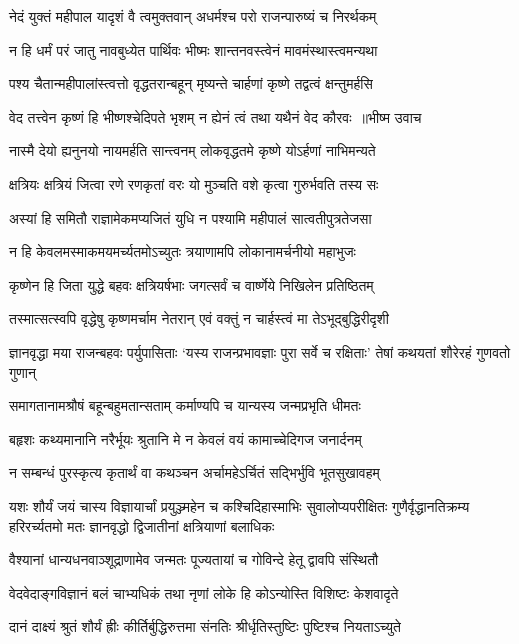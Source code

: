\twolineshloka
{नेदं युक्तं महीपाल यादृशं वै त्वमुक्तवान्}
{अधर्मश्च परो राजन्पारुष्यं च निरर्थकम्}


\twolineshloka
{न हि धर्मं परं जातु नावबुध्येत पार्थिवः}
{भीष्मः शान्तनवस्त्वेनं मावमंस्थास्त्वमन्यथा}


\twolineshloka
{पश्य चैतान्महीपालांस्त्वत्तो वृद्धतरान्बहून्}
{मृष्यन्ते चार्हणां कृष्णे तद्वत्वं क्षन्तुमर्हसि}


\threelineshloka
{वेद तत्त्वेन कृष्णं हि भीष्णश्चेदिपते भृशम्}
{न ह्येनं त्वं तथा यथैनं वेद कौरवः ॥भीष्म उवाच}
{}


\twolineshloka
{नास्मै देयो ह्यनुनयो नायमर्हति सान्त्वनम्}
{लोकवृद्धतमे कृष्णे योऽर्हणां नाभिमन्यते}


\twolineshloka
{क्षत्रियः क्षत्रियं जित्वा रणे रणकृतां वरः}
{यो मुञ्चति वशे कृत्वा गुरुर्भवति तस्य सः}


\twolineshloka
{अस्यां हि समितौ राज्ञामेकमप्यजितं युधि}
{न पश्यामि महीपालं सात्वतीपुत्रतेजसा}


\twolineshloka
{न हि केवलमस्माकमयमर्च्यतमोऽच्युतः}
{त्रयाणामपि लोकानामर्चनीयो महाभुजः}


\twolineshloka
{कृष्णेन हि जिता युद्धे बहवः क्षत्रियर्षभाः}
{जगत्सर्वं च वार्ष्णेये निखिलेन प्रतिष्ठितम्}


\twolineshloka
{तस्मात्सत्स्वपि वृद्धेषु कृष्णमर्चाम नेतरान्}
{एवं वक्तुं न चार्हस्त्वं मा तेऽभूद्बुद्धिरीदृशी}


\threelineshloka
{ज्ञानवृद्धा मया राजन्बहवः पर्युपासिताः}
{`यस्य राजन्प्रभावज्ञाः पुरा सर्वे च रक्षिताः'}
{तेषां कथयतां शौरेरहं गुणवतो गुणान्}


\twolineshloka
{समागतानामश्रौषं बहून्बहुमतान्सताम्}
{कर्माण्यपि च यान्यस्य जन्मप्रभृति धीमतः}


\twolineshloka
{बहृशः कथ्यमानानि नरैर्भूयः श्रुतानि मे}
{न केवलं वयं कामाच्चेदिगज जनार्दनम्}


\twolineshloka
{न सम्बन्धं पुरस्कृत्य कृतार्थं वा कथञ्चन}
{अर्चामहेऽर्चितं सद्भिर्भुवि भूतसुखावहम्}


यशः शौर्यं जयं चास्य विज्ञायार्चां प्रयुञ्ज्महेन च कश्चिदिहास्माभिः सुवालोप्यपरीक्षितः
\twolineshloka
{गुणैर्वृद्धानतिक्रम्य हरिरर्च्यतमो मतः}
{ज्ञानवृद्धो द्विजातीनां क्षत्रियाणां बलाधिकः}


\twolineshloka
{वैश्यानां धान्यधनवाञ्शूद्राणामेव जन्मतः}
{पूज्यतायां च गोविन्दे हेतू द्वावपि संस्थितौ}


\twolineshloka
{वेदवेदाङ्गविज्ञानं बलं चाभ्यधिकं तथा}
{नृणां लोके हि कोऽन्योस्ति विशिष्टः केशवादृते}


\twolineshloka
{दानं दाक्ष्यं श्रुतं शौर्यं ह्रीः कीर्तिर्बुद्धिरुत्तमा}
{संनतिः श्रीर्धृतिस्तुष्टिः पुष्टिश्च नियताऽच्युते}



